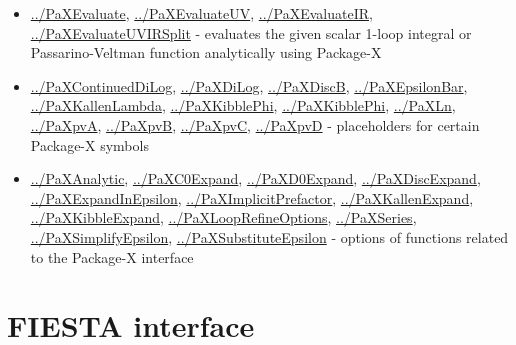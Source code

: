 \documentclass[../FeynHelpersManual.tex]{subfiles}
\begin{document}
\begin{itemize}
\tightlist
\item
  \hyperlink{../paxevaluate}{../PaXEvaluate},
  \hyperlink{../paxevaluateuv}{../PaXEvaluateUV},
  \hyperlink{../paxevaluateir}{../PaXEvaluateIR},
  \hyperlink{../paxevaluateuvirsplit}{../PaXEvaluateUVIRSplit} -
  evaluates the given scalar 1-loop integral or Passarino-Veltman
  function analytically using Package-X
\item
  \hyperlink{../paxcontinueddilog}{../PaXContinuedDiLog},
  \hyperlink{../paxdilog}{../PaXDiLog},
  \hyperlink{../paxdiscb}{../PaXDiscB},
  \hyperlink{../paxepsilonbar}{../PaXEpsilonBar},
  \hyperlink{../paxkallenlambda}{../PaXKallenLambda},
  \hyperlink{../paxkibblephi}{../PaXKibblePhi},
  \hyperlink{../paxkibblephi}{../PaXKibblePhi},
  \hyperlink{../paxln}{../PaXLn}, \hyperlink{../paxpva}{../PaXpvA},
  \hyperlink{../paxpvb}{../PaXpvB}, \hyperlink{../paxpvc}{../PaXpvC},
  \hyperlink{../paxpvd}{../PaXpvD} - placeholders for certain Package-X
  symbols
\item
  \hyperlink{../paxanalytic}{../PaXAnalytic},
  \hyperlink{../paxc0expand}{../PaXC0Expand},
  \hyperlink{../paxd0expand}{../PaXD0Expand},
  \hyperlink{../paxdiscexpand}{../PaXDiscExpand},
  \hyperlink{../paxexpandinepsilon}{../PaXExpandInEpsilon},
  \hyperlink{../paximplicitprefactor}{../PaXImplicitPrefactor},
  \hyperlink{../paxkallenexpand}{../PaXKallenExpand},
  \hyperlink{../paxkibbleexpand}{../PaXKibbleExpand},
  \hyperlink{../paxlooprefineoptions}{../PaXLoopRefineOptions},
  \hyperlink{../paxseries}{../PaXSeries},
  \hyperlink{../paxsimplifyepsilon}{../PaXSimplifyEpsilon},
  \hyperlink{../paxsubstituteepsilon}{../PaXSubstituteEpsilon} - options
  of functions related to the Package-X interface
\end{itemize}

\hypertarget{fiesta interface}{
\section{FIESTA interface}\label{fiesta interface}}
\end{document}
